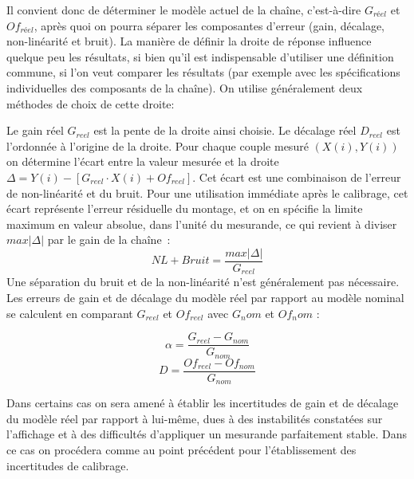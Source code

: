 Il convient donc de déterminer le modèle actuel de la chaîne, c'est-à-dire $G_{réel}$ et $Of_{réel}$, après quoi on pourra séparer les composantes d'erreur (gain, décalage, non-linéarité et bruit). La manière de définir la droite de réponse influence quelque peu les résultats, si bien qu'il est indispensable d'utiliser une définition commune, si l'on veut comparer les résultats (par exemple avec les spécifications individuelles des composants de la chaîne). On utilise généralement deux méthodes de choix de cette droite:
\begin{center}
\end{center}

Le gain réel $G_{reel}$ est la pente de la droite ainsi choisie. Le décalage réel $D_{reel}$ est l'ordonnée à l'origine de la droite. Pour chaque couple mesuré $(X(i),Y(i))$ on détermine l'écart entre la valeur mesurée et la droite $\Delta = Y(i) - [G_{reel}\cdot X(i) + Of_{reel}]$. Cet écart est une combinaison de l'erreur de non-linéarité et du bruit. Pour une utilisation immédiate après le calibrage, cet écart représente l'erreur résiduelle du montage, et on en spécifie la limite maximum en valeur absolue, dans l'unité du mesurande, ce qui revient à diviser $max{|\Delta|}$ par le gain de la chaîne~:
\[
	NL+Bruit = \frac{max{|\Delta|}}{G_{reel}}
\]
Une séparation du bruit et de la non-linéarité n'est généralement pas nécessaire.
Les erreurs de gain et de décalage du modèle réel par rapport au modèle nominal se calculent en comparant $G_{reel}$ et $Of_{reel}$ avec $G_nom$ et $Of_nom$ :

\[\alpha =  \frac{G_{reel}-G_{nom}}{G_{nom}}	 \]
\[D =  \frac{Of_{reel}-Of_{nom}}{G_{nom}} \]

Dans certains cas on sera amené à établir les incertitudes de gain et de décalage du modèle réel par rapport à lui-même, dues à des instabilités constatées sur l'affichage et à des difficultés d'appliquer un mesurande parfaitement stable. Dans ce cas on procédera comme au point précédent pour l'établissement des incertitudes de calibrage.

